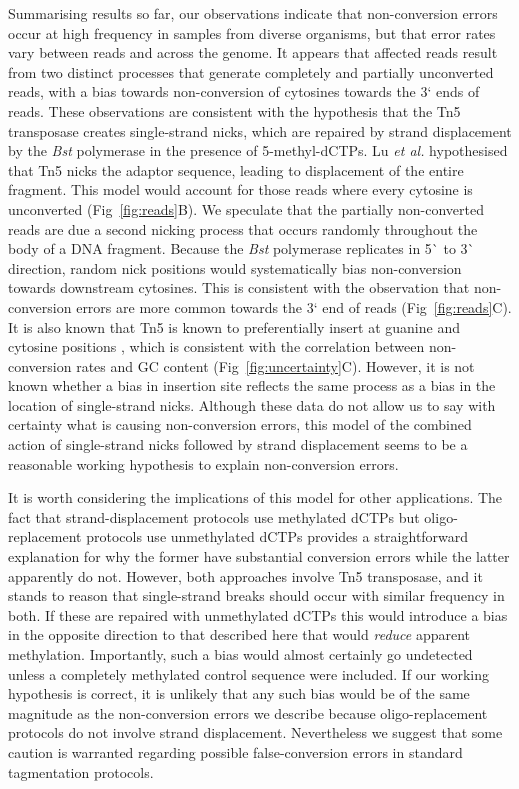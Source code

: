 \documentclass[10pt,letterpaper,draft]{article}
\begin{document}
Summarising results so far, our observations indicate that non-conversion errors occur at high frequency in samples from diverse organisms, but that error rates vary between reads and across the genome.
It appears that affected reads result from two distinct processes that generate completely and partially unconverted reads, with a bias towards non-conversion of cytosines towards the 3` ends of reads.
These observations are consistent with the hypothesis that the Tn5 transposase creates single-strand nicks, which are repaired by strand displacement by the \textit{Bst} polymerase in the presence of 5-methyl-dCTPs.
Lu \textit{et al.} \cite{lu2015improved} hypothesised that Tn5 nicks the adaptor sequence, leading to displacement of the entire fragment.
This model would account for those reads where every cytosine is unconverted (Fig~\ref{fig:reads}B).
We speculate that the partially non-converted reads are due a second nicking process that occurs randomly throughout the body of a DNA fragment.
Because the \textit{Bst} polymerase replicates in 5\`{} to 3\`{} direction, random nick positions would systematically bias non-conversion towards downstream cytosines.
This is consistent with the observation that non-conversion errors are more common towards the 3` end of reads (Fig~\ref{fig:reads}C).
It is also known that Tn5 is known to preferentially insert at guanine and cytosine positions \cite{goryshin1998tn, green2012insertion}, which is consistent with the correlation between non-conversion rates and GC content (Fig~\ref{fig:uncertainty}C).
However, it is not known whether a bias in insertion site reflects the same process as a bias in the location of single-strand nicks.
Although these data do not allow us to say with certainty what is causing non-conversion errors, this model of the combined action of single-strand nicks followed by strand displacement seems to be a reasonable working hypothesis to explain non-conversion errors.

It is worth considering the implications of this model for other applications.
The fact that strand-displacement protocols use methylated dCTPs but oligo-replacement protocols use unmethylated dCTPs provides a straightforward explanation for why the former have substantial conversion errors while the latter apparently do not.
However, both approaches involve Tn5 transposase, and it stands to reason that single-strand breaks should occur with similar frequency in both.
If these are repaired with unmethylated dCTPs this would introduce a bias in the opposite direction to that described here that would \textit{reduce} apparent methylation.
Importantly, such a bias would almost certainly go undetected unless a completely methylated control sequence were included.
If our working hypothesis is correct, it is unlikely that any such bias would be of the same magnitude as the non-conversion errors we describe because oligo-replacement protocols do not involve strand displacement.
Nevertheless we suggest that some caution is warranted regarding possible false-conversion errors in standard tagmentation protocols.
\end{document}
